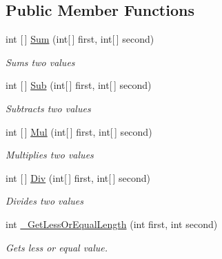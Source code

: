 \subsection*{Public Member Functions}
\begin{DoxyCompactItemize}
\item 
int \mbox{[}$\,$\mbox{]} \mbox{\hyperlink{class_test_project_1_1_task_library_1_1_tasks_1_1_lesson12_1_1_models_1_1_int_array_calculator_a49b88f4f694361be852830b954b15943}{Sum}} (int\mbox{[}$\,$\mbox{]} first, int\mbox{[}$\,$\mbox{]} second)
\begin{DoxyCompactList}\small\item\em Sums two values \end{DoxyCompactList}\item 
int \mbox{[}$\,$\mbox{]} \mbox{\hyperlink{class_test_project_1_1_task_library_1_1_tasks_1_1_lesson12_1_1_models_1_1_int_array_calculator_a16767fc63eca5f72c5387c1ab7222239}{Sub}} (int\mbox{[}$\,$\mbox{]} first, int\mbox{[}$\,$\mbox{]} second)
\begin{DoxyCompactList}\small\item\em Subtracts two values \end{DoxyCompactList}\item 
int \mbox{[}$\,$\mbox{]} \mbox{\hyperlink{class_test_project_1_1_task_library_1_1_tasks_1_1_lesson12_1_1_models_1_1_int_array_calculator_aa76583f14e2435db0777265707b7067c}{Mul}} (int\mbox{[}$\,$\mbox{]} first, int\mbox{[}$\,$\mbox{]} second)
\begin{DoxyCompactList}\small\item\em Multiplies two values \end{DoxyCompactList}\item 
int \mbox{[}$\,$\mbox{]} \mbox{\hyperlink{class_test_project_1_1_task_library_1_1_tasks_1_1_lesson12_1_1_models_1_1_int_array_calculator_a6ae945da506bbe6c638902b895f50b44}{Div}} (int\mbox{[}$\,$\mbox{]} first, int\mbox{[}$\,$\mbox{]} second)
\begin{DoxyCompactList}\small\item\em Divides two values \end{DoxyCompactList}\item 
int \mbox{\hyperlink{class_test_project_1_1_task_library_1_1_tasks_1_1_lesson12_1_1_models_1_1_int_array_calculator_a6b22d86c727f4072ce76d4bb58e9512b}{\+\_\+\+Get\+Less\+Or\+Equal\+Length}} (int first, int second)
\begin{DoxyCompactList}\small\item\em Gets less or equal value. \end{DoxyCompactList}\end{DoxyCompactItemize}


